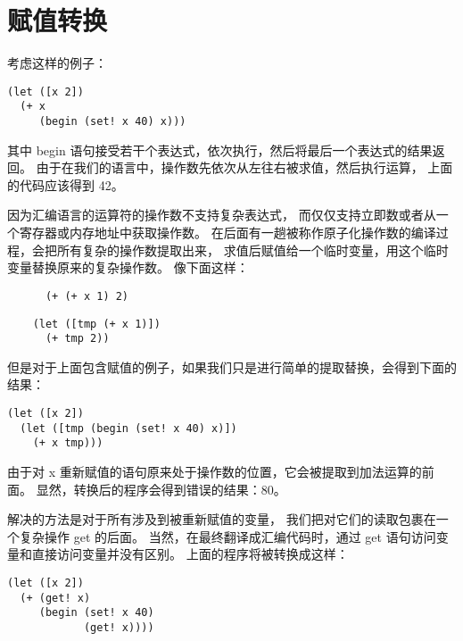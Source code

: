 
\section{赋值转换}

考虑这样的例子：

\begin{multilinecode}
\begin{lstlisting}
(let ([x 2])
  (+ x
     (begin (set! x 40) x)))
\end{lstlisting}
\end{multilinecode}

其中 begin 语句接受若干个表达式，依次执行，然后将最后一个表达式的结果返回。
由于在我们的语言中，操作数先依次从左往右被求值，然后执行运算，
上面的代码应该得到 42。

因为汇编语言的运算符的操作数不支持复杂表达式，
而仅仅支持立即数或者从一个寄存器或内存地址中获取操作数。
在后面有一趟被称作原子化操作数的编译过程，会把所有复杂的操作数提取出来，
求值后赋值给一个临时变量，用这个临时变量替换原来的复杂操作数。
像下面这样：

\begin{transformation}
\begin{lstlisting}
      (+ (+ x 1) 2)
\end{lstlisting}
\compilesto
\begin{lstlisting}
    (let ([tmp (+ x 1)])
      (+ tmp 2))
\end{lstlisting}
\end{transformation}

但是对于上面包含赋值的例子，如果我们只是进行简单的提取替换，会得到下面的结果：

\begin{multilinecode}
\begin{lstlisting}
(let ([x 2])
  (let ([tmp (begin (set! x 40) x)])
    (+ x tmp)))
\end{lstlisting}
\end{multilinecode}

由于对 x 重新赋值的语句原来处于操作数的位置，它会被提取到加法运算的前面。
显然，转换后的程序会得到错误的结果：80。

解决的方法是对于所有涉及到被重新赋值的变量，
我们把对它们的读取包裹在一个复杂操作 get 的后面。
当然，在最终翻译成汇编代码时，通过 get 语句访问变量和直接访问变量并没有区别。
上面的程序将被转换成这样：

\begin{multilinecode}
\begin{lstlisting}
(let ([x 2])
  (+ (get! x)
     (begin (set! x 40)
            (get! x))))
\end{lstlisting}
\end{multilinecode}

